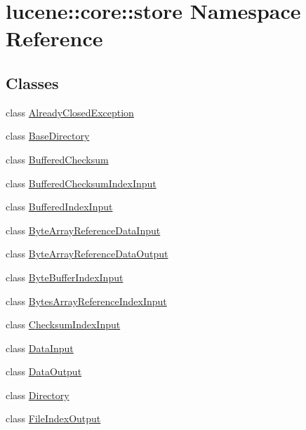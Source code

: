 \hypertarget{namespacelucene_1_1core_1_1store}{}\section{lucene\+:\+:core\+:\+:store Namespace Reference}
\label{namespacelucene_1_1core_1_1store}
\subsection*{Classes}
\begin{DoxyCompactItemize}
\item 
class \mbox{\hyperlink{classlucene_1_1core_1_1store_1_1AlreadyClosedException}{Already\+Closed\+Exception}}
\item 
class \mbox{\hyperlink{classlucene_1_1core_1_1store_1_1BaseDirectory}{Base\+Directory}}
\item 
class \mbox{\hyperlink{classlucene_1_1core_1_1store_1_1BufferedChecksum}{Buffered\+Checksum}}
\item 
class \mbox{\hyperlink{classlucene_1_1core_1_1store_1_1BufferedChecksumIndexInput}{Buffered\+Checksum\+Index\+Input}}
\item 
class \mbox{\hyperlink{classlucene_1_1core_1_1store_1_1BufferedIndexInput}{Buffered\+Index\+Input}}
\item 
class \mbox{\hyperlink{classlucene_1_1core_1_1store_1_1ByteArrayReferenceDataInput}{Byte\+Array\+Reference\+Data\+Input}}
\item 
class \mbox{\hyperlink{classlucene_1_1core_1_1store_1_1ByteArrayReferenceDataOutput}{Byte\+Array\+Reference\+Data\+Output}}
\item 
class \mbox{\hyperlink{classlucene_1_1core_1_1store_1_1ByteBufferIndexInput}{Byte\+Buffer\+Index\+Input}}
\item 
class \mbox{\hyperlink{classlucene_1_1core_1_1store_1_1BytesArrayReferenceIndexInput}{Bytes\+Array\+Reference\+Index\+Input}}
\item 
class \mbox{\hyperlink{classlucene_1_1core_1_1store_1_1ChecksumIndexInput}{Checksum\+Index\+Input}}
\item 
class \mbox{\hyperlink{classlucene_1_1core_1_1store_1_1DataInput}{Data\+Input}}
\item 
class \mbox{\hyperlink{classlucene_1_1core_1_1store_1_1DataOutput}{Data\+Output}}
\item 
class \mbox{\hyperlink{classlucene_1_1core_1_1store_1_1Directory}{Directory}}
\item 
class \mbox{\hyperlink{classlucene_1_1core_1_1store_1_1FileIndexOutput}{File\+Index\+Output}}

\end{DoxyCompactItemize}
